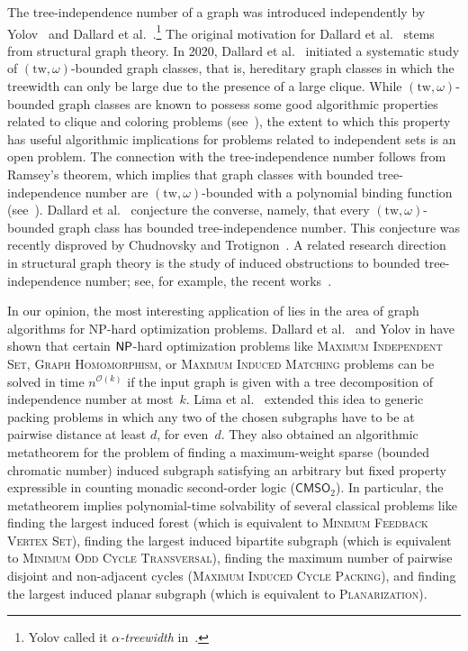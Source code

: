 \documentclass[11pt]{article}
\newcommand{\cmsotwo}{$\mathsf{CMSO}_2$\xspace}
\theoremstyle{definition}
\newcommand{\tw}{\mathrm{tw}}
\newcommand{\NP}{\textup{\textsf{NP}}}
\newcommand{\OO}{\mathcal{O}}
\begin{document}
The tree-independence number of a graph was introduced independently by Yolov~\cite{Yolov18} and Dallard et al.~\cite{DallardMS24}.\footnote{Yolov called it \emph{$\alpha$-treewidth} in~\cite{Yolov18}.}
The original motivation for Dallard et al.~\cite{DallardMS24} stems from structural graph theory.
In 2020, Dallard et al.~\cite{DMS-WG2020,dallard2021treewidth} initiated a systematic study of $(\tw,\omega)$-bounded graph classes, that is, hereditary graph classes in which the treewidth can only be large due to the presence of a large clique.
While $(\tw,\omega)$-bounded graph classes are known to possess some good algorithmic properties related to clique and coloring problems (see~\cite{DBLP:journals/endm/ChaplickZ17,MR4332111,DMS-WG2020,dallard2021treewidth,DallardMS24}), the extent to which this property has useful algorithmic implications for problems related to independent sets is an open problem.
The connection with the tree-independence number follows from Ramsey's theorem, which implies that graph classes with bounded tree-independence number are $(\tw,\omega)$-bounded with a polynomial binding function (see~\cite{DallardMS24}).
Dallard et al.~\cite{dallard2022secondpaper} conjecture the converse, namely, that every $(\tw,\omega)$-bounded graph class has bounded tree-independence number.
This conjecture was recently disproved by Chudnovsky and Trotignon~\cite{CT24}.
A related research direction in structural graph theory is the study of induced obstructions to bounded tree-independence number; see, for example, the recent works~\cite{dallard2024treewidthversuscliquenumber,abrishami2023tree,chudnovsky2024treeindependencenumberiv,chudnovsky2024treeindependencenumberiii,chudnovsky2024treeindependencenumberii}.

In our opinion, the most interesting application of   lies in the area of graph algorithms for \NP-hard optimization problems. Dallard et al.~\cite{DallardMS24} and Yolov in \cite{Yolov18} have shown that certain $\NP$-hard optimization problems like \textsc{Maximum Independent Set}, \textsc{Graph Homomorphism}, or \textsc{Maximum Induced Matching} problems can be solved in time $n^{\OO(k)}$ if the input graph is given with a tree decomposition of independence number at most~$k$.
Lima et al.~\cite{LMMORS24} extended this idea to generic packing problems in which any two of the chosen subgraphs have to be at pairwise distance at least $d$, for even~$d$.
They also obtained an algorithmic metatheorem for the problem of finding a maximum-weight sparse (bounded chromatic number) induced subgraph satisfying an arbitrary but fixed property expressible in counting monadic second-order logic (\cmsotwo).
In particular, the metatheorem implies polynomial-time solvability of several classical problems like finding the largest induced forest (which is equivalent to \textsc{Minimum Feedback Vertex Set}), finding the largest induced bipartite subgraph (which is equivalent to \textsc{Minimum Odd Cycle Transversal}), finding the maximum number of pairwise disjoint and non-adjacent cycles (\textsc{Maximum Induced Cycle Packing}), and finding the largest induced planar subgraph (which is equivalent to \textsc{Planarization}).
\end{document}
